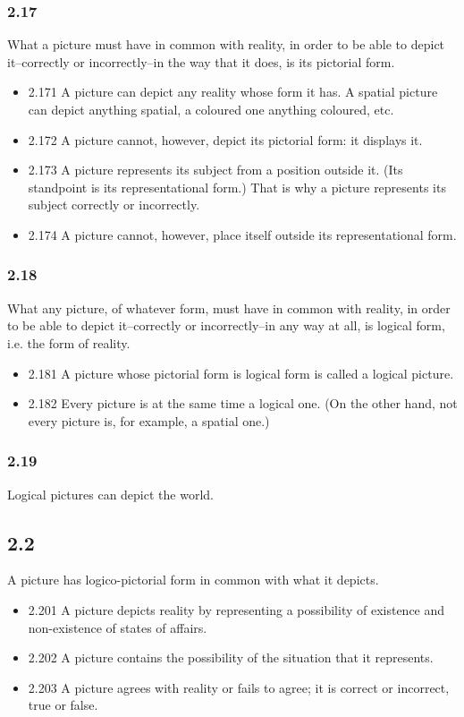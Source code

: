 \documentclass[11pt]{article}
\begin{document}
\subsubsection*{2.17}
\label{sec:org83e371b}
What a picture must have in common with reality, in order to be able
to depict it--correctly or incorrectly--in the way that it does, is its
pictorial form.
\begin{itemize}
\item 2.171
\label{sec:org46263fc}
A picture can depict any reality whose form it has. A spatial picture
can depict anything spatial, a coloured one anything coloured, etc.
\item 2.172
\label{sec:org154d895}
A picture cannot, however, depict its pictorial form: it displays it.
\item 2.173
\label{sec:org569c727}
A picture represents its subject from a position outside it. (Its
standpoint is its representational form.) That is why a picture represents
its subject correctly or incorrectly.
\item 2.174
\label{sec:orgcb326bf}
A picture cannot, however, place itself outside its representational
form.
\end{itemize}
\subsubsection*{2.18}
\label{sec:org1540955}
What any picture, of whatever form, must have in common with reality,
in order to be able to depict it--correctly or incorrectly--in any way at
all, is logical form, i.e. the form of reality.
\begin{itemize}
\item 2.181
\label{sec:orgcb8b56d}
A picture whose pictorial form is logical form is called a logical
picture.
\item 2.182
\label{sec:org6caf870}
Every picture is at the same time a logical one. (On the other hand,
not every picture is, for example, a spatial one.)
\end{itemize}
\subsubsection*{2.19}
\label{sec:org83c74a4}
Logical pictures can depict the world.
\subsection*{2.2}
\label{sec:orgecfb403}
A picture has logico-pictorial form in common with what it depicts.
\begin{itemize}
\item 2.201
\label{sec:org9f74c18}
A picture depicts reality by representing a possibility of existence
and non-existence of states of affairs.
\item 2.202
\label{sec:org79eb5e2}
A picture contains the possibility of the situation that it
represents.
\item 2.203
\label{sec:orgf86a898}
A picture agrees with reality or fails to agree; it is correct or
incorrect, true or false.
\end{itemize}
\end{document}
